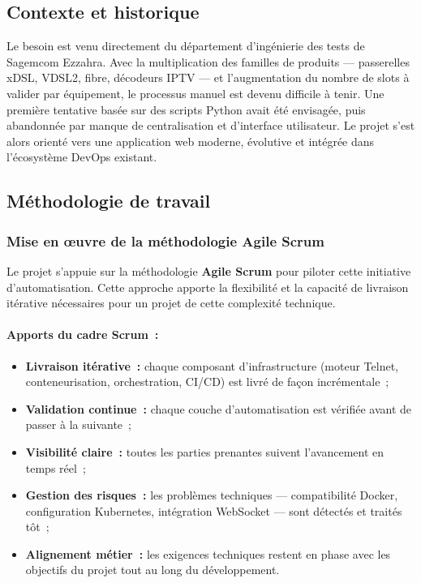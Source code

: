 \subsection{Contexte et historique}

Le besoin est venu directement du département d'ingénierie des tests
de Sagemcom Ezzahra. Avec la multiplication des familles de produits
--- passerelles xDSL, VDSL2, fibre, décodeurs IPTV --- et l'augmentation
du nombre de slots à valider par équipement, le processus manuel est
devenu difficile à tenir. Une première tentative basée sur des scripts
Python avait été envisagée, puis abandonnée par manque de centralisation
et d'interface utilisateur. Le projet s'est alors orienté vers une
application web moderne, évolutive et intégrée dans l'écosystème DevOps
existant.

\subsection{Méthodologie de travail}

\subsubsection{Mise en \oe{}uvre de la méthodologie Agile Scrum}

Le projet s'appuie sur la méthodologie \textbf{Agile Scrum} pour piloter
cette initiative d'automatisation. Cette approche apporte la flexibilité
et la capacité de livraison itérative nécessaires pour un projet de cette
complexité technique.

\paragraph{Apports du cadre Scrum~:}
\begin{itemize}
  \item \textbf{Livraison itérative~:} chaque composant d'infrastructure
        (moteur Telnet, conteneurisation, orchestration, CI/CD) est livré
        de façon incrémentale~;
  \item \textbf{Validation continue~:} chaque couche d'automatisation est
        vérifiée avant de passer à la suivante~;
  \item \textbf{Visibilité claire~:} toutes les parties prenantes suivent
        l'avancement en temps réel~;
  \item \textbf{Gestion des risques~:} les problèmes techniques ---
        compatibilité Docker, configuration Kubernetes, intégration
        WebSocket --- sont détectés et traités tôt~;
  \item \textbf{Alignement métier~:} les exigences techniques restent en
        phase avec les objectifs du projet tout au long du développement.
\end{itemize}

